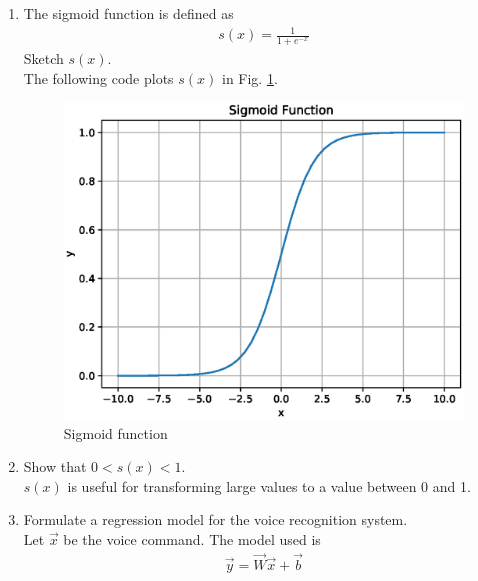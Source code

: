 \documentclass[journal,12pt,twocolumn]{IEEEtran}
\renewcommand\thesection{\arabic{section}}
\begin{document}
\begin{enumerate}[label=\thesection.\arabic*
,ref=\thesection.\theenumi]
\\
\solution See Table \ref{fig:ref_vec}.
\begin{table}[!ht]
\begin{center}

\end{center}
\caption{Reference vectors}
\label{fig:ref_vec}
\end{table}
%
\item The sigmoid function is defined as
\begin{align}
\label{eq:sig}
s(x) = \frac{1}{1+e^{-x}}
\end{align}
Sketch $s(x)$.
\\
\solution The following code plots $s(x)$ in Fig. \ref{fig:sigmoid}.
\begin{figure}[ht!]
\begin{center}
\includegraphics[width=\columnwidth]{./figs/sigmoid.eps}
\end{center}
\caption{Sigmoid function }
\label{fig:sigmoid}
\end{figure}
\item Show that $0 < s(x) < 1$.
\\
\solution $s(x)$ is useful for transforming large values to a value between 0 and 1.
\item Formulate a regression model for the voice recognition system.
\\
\solution Let $\vec{x}$ be the voice command. The model used is
\begin{align}
\label{eq:ls}
\vec{y} = \vec{W}\vec{x}+\vec{b}
\end{align}

\end{enumerate}
\end{document}
